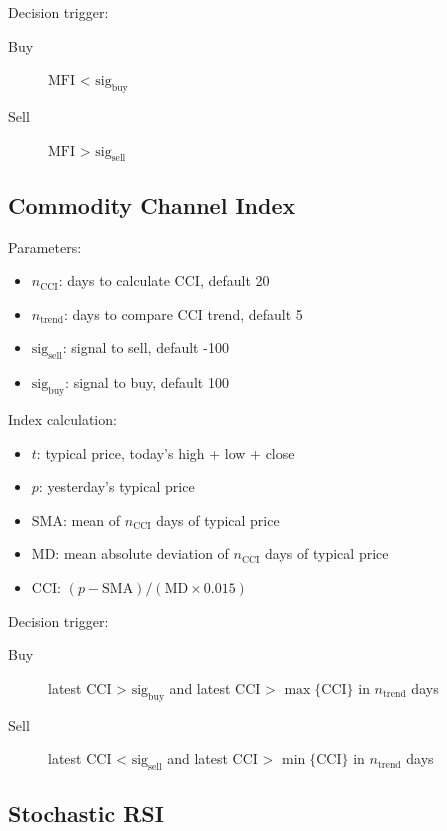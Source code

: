 \documentclass{article}
\begin{document}
Decision trigger:
\begin{description}
    \item[Buy] $\text{MFI}$ < $\text{sig}_{\text{buy}}$
    \item[Sell] $\text{MFI}$ > $\text{sig}_{\text{sell}}$
\end{description}


\subsection{Commodity Channel Index}

Parameters\cite{stock-market-prediction-model-using-TPWS}:
\begin{itemize}
    \item $n_{\text{CCI}}$: days to calculate CCI, default 20
    \item $n_{\text{trend}}$: days to compare CCI trend, default 5
    \item $\text{sig}_{\text{sell}}$: signal to sell, default -100
    \item $\text{sig}_{\text{buy}}$: signal to buy, default 100
\end{itemize}

Index calculation:
\begin{itemize}
    \item $t$: typical price, today's high + low + close
    \item $p$: yesterday's typical price
    \item $\text{SMA}$: mean of $n_{\text{CCI}}$ days of typical price
    \item $\text{MD}$: mean absolute deviation of $n_{\text{CCI}}$ days of typical price
    \item $\text{CCI}$: $(p - \text{SMA}) / (\text{MD} \times 0.015)$
\end{itemize}

Decision trigger:
\begin{description}
    \item[Buy] latest CCI > $\text{sig}_{\text{buy}}$ and latest CCI > $\max\{\text{CCI}\}$ in $n_{\text{trend}}$ days
    \item[Sell] latest CCI < $\text{sig}_{\text{sell}}$ and latest CCI > $\min\{\text{CCI}\}$ in $n_{\text{trend}}$ days
\end{description}

\subsection{Stochastic RSI}
\end{document}
